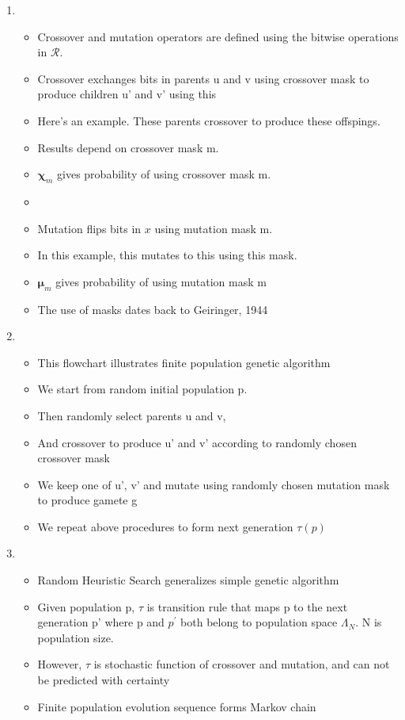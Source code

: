 \documentclass{article}
\begin{document}
\begin{enumerate}
\item
  \begin{itemize}
  \item Crossover and mutation operators are defined using the
    bitwise operations in $\mathcal{R}$.
  \item Crossover exchanges bits in parents u and v using crossover mask
  to produce children u' and v' using this
  \item Here's an example. These parents crossover to produce these offspings.
  \item Results depend on crossover mask m. 
  \item $\bm{\chi}_m$ gives probability of using crossover mask m.
  \item
  \item Mutation flips bits in $x$ using mutation mask m.
  \item In this example, this mutates to this using this mask.
  \item $\bm{\mu}_m$ gives probability of using mutation mask m
  \item The use of masks dates back to Geiringer, 1944
  \end{itemize}
    
\item
  \begin{itemize}
  \item This flowchart illustrates finite population genetic algorithm
  \item We start from random initial population p.
  \item Then randomly select parents u and v, 
  \item And crossover to produce u' and v' according to randomly chosen crossover mask
  \item We keep one of u', v' and mutate using randomly chosen mutation mask to produce gamete g
  \item We repeat above procedures to form next generation $\tau(p)$
  \end{itemize}
  
\item
  \begin{itemize}
  \item Random Heuristic Search generalizes simple genetic algorithm
  \item Given population p, $\tau$ is transition rule that maps p to
    the next generation p' where p and $p^\prime$ both belong to population space $\Lambda_N$.
    N is population size. 
    \item However, $\tau$ is stochastic function of crossover and
    mutation, and can not be predicted with
    certainty 
  \item Finite population evolution sequence forms
    Markov chain
  

\end{itemize}
\end{enumerate}
\end{document}
